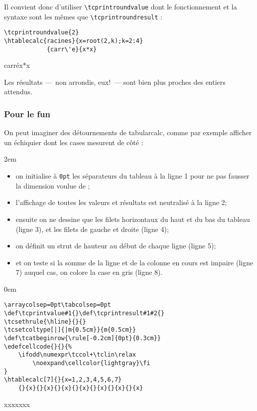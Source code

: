 \documentclass[a4paper,10pt]{article}
\newcommand\tbcalc{\textsf{tabularcalc}\xspace}
\newcommand\verbinline{\lstinline[breaklines=false,basicstyle=\normalsize\ttfamily]}
\newcommand\mywidth{0.85\linewidth}
\begin{document}
Il convient donc d'utiliser \verbinline|\tcprintroundvalue| dont le fonctionnement et la syntaxe sont les mêmes que \verbinline|\tcprintroundresult| :
\begin{center}
\begin{minipage}{\mywidth}
\begin{lstlisting}
\tcprintroundvalue{2}
\htablecalc{racines}{x=root(2,k);k=2:4}
            {carr\'e}{x*x}
\end{lstlisting}
\end{minipage}

            {carr\'e}{x*x}
\end{center}
Les résultats ---~non arrondis, eux!~--- sont bien plus proches des entiers attendus.

\subsubsection{Pour le fun}
On peut imaginer des détournements de \tbcalc, comme par exemple afficher un échiquier dont les cases mesurent  de côté :\par\nobreak\parindent2em
\begin{itemize}
	\item on initialise à \verb|0pt| les séparateurs du tableau à la ligne 1 pour ne pas fausser la dimension voulue de ;
	\item l'affichage de toutes les valeurs et résultats est neutralisé à la ligne 2;
	\item ensuite on ne dessine que les filets horizontaux du haut et du bas du tableau (ligne 3), et les filets de gauche et droite (ligne 4);
	\item on définit un strut de hauteur  au début de chaque ligne (ligne 5);
	\item et on teste si la somme de la ligne et de la colonne en cours est impaire (ligne 7) auquel cas, on colore la case en gris (ligne 8).
\end{itemize}\parindent0em
\begin{center}
\begin{minipage}{\mywidth}
\begin{lstlisting}
\arraycolsep=0pt\tabcolsep=0pt
\def\tcprintvalue#1{}\def\tcprintresult#1#2{}
\tcsethrule{\hline}{}{}
\tcsetcoltype[|]{|m{0.5cm}}{m{0.5cm}}
\def\tcatbeginrow{\rule[-0.2cm]{0pt}{0.3cm}}
\edefcellcode{}{}{%
	\ifodd\numexpr\tccol+\tclin\relax
		\noexpand\cellcolor{lightgray}\fi
}
\htablecalc[7]{}{x=1,2,3,4,5,6,7}
	{}{x}{}{x}{}{x}{}{x}{}{x}{}{x}{}{x}
\end{lstlisting}
\end{minipage}

\arraycolsep=0pt\tabcolsep=0pt
\def\tcprintvalue#1{}\def\tcprintresult#1#2{}
\tcsethrule{\hline}{}{}
\def\tcatbeginrow{\rule[-0.2cm]{0pt}{0.3cm}}
	{}{x}{}{x}{}{x}{}{x}{}{x}{}{x}{}{x}
\end{center}
\end{document}
